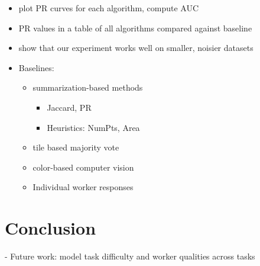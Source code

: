 \documentclass[letterpaper]{article} %
\begin{document}
\begin{itemize}
\item plot PR curves for each algorithm, compute AUC
\item PR values in a table of all algorithms compared against baseline
\item show that our experiment works well on smaller, noisier datasets
\item Baselines: 
\begin{itemize}
\item summarization-based methods
\begin{itemize}
\item Jaccard, PR
\item Heuristics: NumPts, Area
\end{itemize}
\item tile based majority vote 
\item color-based computer vision
\item Individual worker responses
\end{itemize}
\end{itemize}
\section{Conclusion}
- Future work: model task difficulty and worker qualities across tasks



\end{document}
